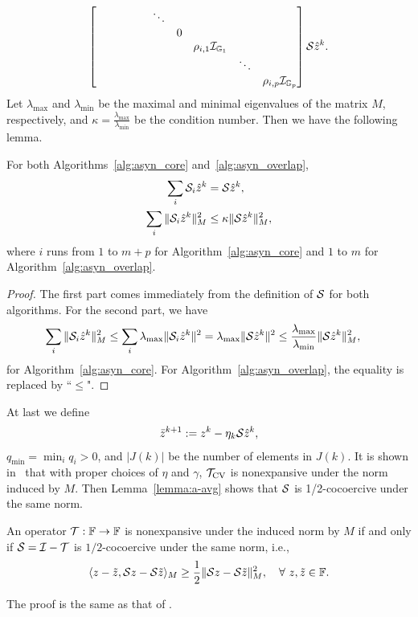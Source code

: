 {$$\begin{bmatrix}
&&&&&\ddots&&&&\\
&&&&&&0&&&\\
&&&&&&&\rho_{i,1}\cI_{\GG_1}&&\\
&&&&&&&&\ddots&\\
&&&&&&&&&\rho_{i,p}\cI_{\GG_p}
\end{bmatrix}\cS\hat{z}^k.$$
Let $\lambda_{\max}$ and $\lambda_{\min}$ be the
maximal and minimal eigenvalues of the matrix $M$, respectively, and $\kappa=\frac{\lambda_{\max}}{\lambda_{\min}}$ be the condition number.
Then we have the following lemma.
\begin{lemma}
For both Algorithms~\ref{alg:asyn_core} and~\ref{alg:asyn_overlap},
\begin{align}
\sum_{i}\cS_i\hat{z}^k&=\cS\hat{z}^k,\\
\sum_{i}\|\cS_i\hat{z}^k\|_M^2&\leq \kappa\|\cS\hat{z}^k\|_M^2,\label{eqn:bound_lemma1}
\end{align}
where $i$ runs from $1$ to $m+p$ for Algorithm~\ref{alg:asyn_core} and $1$ to $m$ for Algorithm~\ref{alg:asyn_overlap}.
\end{lemma}
\begin{proof} The first part comes immediately from the definition of ${\mathcal{S}}$ for both algorithms. For the second part, we have
\begin{align}
\sum_{i}\|\cS_i\hat{z}^k\|_M^2&\leq \sum_{i} \lambda_{\max}\|\cS_i\hat{z}^k\|^2 = \lambda_{\max}\|\cS\hat{z}^k\|^2\leq {\lambda_{\max}\over\lambda_{\min}}\|\cS\hat{z}^k\|^2_M,
\end{align}
for Algorithm~\ref{alg:asyn_core}. For Algorithm~\ref{alg:asyn_overlap}, the equality is replaced by ``$\leq$".
\end{proof}


At last we define
\begin{align}\label{eqn:def_bar_x}
\bar{z}^{k+1} := z^k - \eta_k \cS\hat{z}^{k},
\end{align}
$q_{\min}=\min_iq_i>0$, and $|J(k)|$ be the number of elements in $J(k)$. 
It is shown in~\cite{davis2014convergence} that with proper choices of $\eta$ and $\gamma$, ${{\mathcal{T}}_{\textnormal{CV}}}$ is nonexpansive under the norm induced by $M$. Then Lemma~\ref{lemma:a-avg} shows that ${\mathcal{S}}$ is 1/2-cocoercive under the same norm.
\begin{lemma}\label{lemma:a-avg} An operator ${\mathcal{T}}:\mathbb{F}\to\mathbb{F}$ is nonexpansive under the induced norm by $M$ if and only if ${\mathcal{S}} = {\mathcal{I}} - {\mathcal{T}}$ is {${1}/{2}$-cocoercive} under the same norm, i.e.,
\begin{equation}\label{eqn:alpha_avg}
\langle z-\tilde{z},\cS z- \cS\tilde{z}\rangle_M \ge \frac{1}{2}\|\cS z- \cS\tilde{z}\|_M^2,\quad
{\forall~z,\tilde{z}\in\FF}.
\end{equation}
\end{lemma}
The proof is the same as that of \cite[Proposition 4.33]{bauschke2011convex}. 

}
